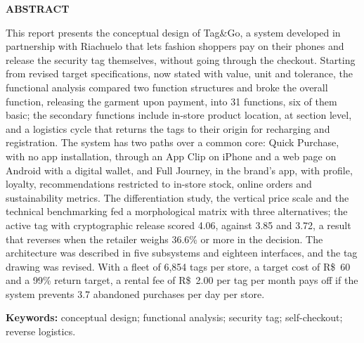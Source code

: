 \begin{center}
    \textbf{ABSTRACT}
\end{center}

\noindent This report presents the conceptual design of Tag\&Go, a system developed in partnership with Riachuelo that lets fashion shoppers pay on their phones and release the security tag themselves, without going through the checkout. Starting from revised target specifications, now stated with value, unit and tolerance, the functional analysis compared two function structures and broke the overall function, releasing the garment upon payment, into 31 functions, six of them basic; the secondary functions include in-store product location, at section level, and a logistics cycle that returns the tags to their origin for recharging and registration. The system has two paths over a common core: Quick Purchase, with no app installation, through an App Clip on iPhone and a web page on Android with a digital wallet, and Full Journey, in the brand's app, with profile, loyalty, recommendations restricted to in-store stock, online orders and sustainability metrics. The differentiation study, the vertical price scale and the technical benchmarking fed a morphological matrix with three alternatives; the active tag with cryptographic release scored 4.06, against 3.85 and 3.72, a result that reverses when the retailer weighs 36.6\% or more in the decision. The architecture was described in five subsystems and eighteen interfaces, and the tag drawing was revised. With a fleet of 6,854 tags per store, a target cost of R\$~60 and a 99\% return target, a rental fee of R\$~2.00 per tag per month pays off if the system prevents 3.7 abandoned purchases per day per store.

\vspace{1em}
\noindent\textbf{Keywords:} conceptual design; functional analysis; security tag; self-checkout; reverse logistics.
